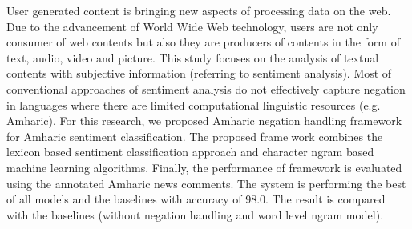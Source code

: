 User generated content is bringing new aspects of processing data on the web. Due to the advancement of World Wide Web technology, users are not only consumer of web contents but also they are producers of contents in the form of text, audio, video and picture. This study focuses on the analysis of textual contents with subjective information (referring to sentiment analysis). Most of conventional approaches of sentiment analysis do not effectively capture negation in languages where there are limited computational linguistic resources (e.g. Amharic). For this research, we proposed Amharic negation handling framework for Amharic sentiment classification. The proposed framework combines the lexicon based sentiment classification approach and character ngram based machine learning algorithms. Finally, the performance of framework is evaluated using the annotated Amharic news comments. The system is performing the best of all models and the baselines with accuracy of 98.0. The result is compared with the baselines (without negation handling and word level ngram model).
